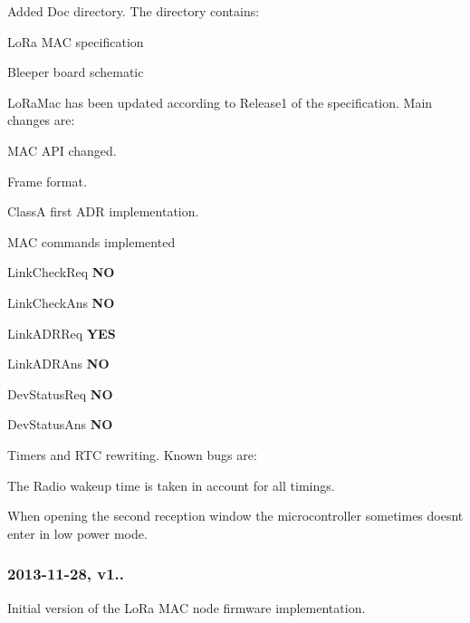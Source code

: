 \begin{DoxyItemize}
\item Added Doc directory. The directory contains\+:
\begin{DoxyEnumerate}
\item Lo\+Ra M\+AC specification
\item Bleeper board schematic
\end{DoxyEnumerate}
\item Lo\+Ra\+Mac has been updated according to Release1 of the specification. Main changes are\+:
\begin{DoxyEnumerate}
\item M\+AC A\+PI changed.
\item Frame format.
\item ClassA first A\+DR implementation.
\item M\+AC commands implemented
\begin{DoxyItemize}
\item Link\+Check\+Req {\bfseries NO}
\item Link\+Check\+Ans {\bfseries NO}
\item Link\+A\+D\+R\+Req {\bfseries Y\+ES}
\item Link\+A\+D\+R\+Ans {\bfseries NO}
\item Dev\+Status\+Req {\bfseries NO}
\item Dev\+Status\+Ans {\bfseries NO}
\end{DoxyItemize}
\end{DoxyEnumerate}
\item Timers and R\+TC rewriting. Known bugs are\+:
\begin{DoxyEnumerate}
\item The Radio wakeup time is taken in account for all timings.
\item When opening the second reception window the microcontroller sometimes doesn\textquotesingle{}t enter in low power mode.
\end{DoxyEnumerate}
\end{DoxyItemize}

\subsubsection*{2013-\/11-\/28, v1..}


\begin{DoxyItemize}
\item Initial version of the Lo\+Ra M\+AC node firmware implementation. 
\end{DoxyItemize}